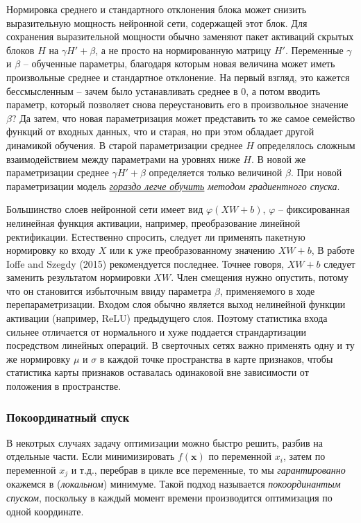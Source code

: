 \documentclass[%
	11pt,
	a4paper,
	utf8,
]{article}
\begin{document}
Нормировка среднего и стандартного отклонения блока может снизить выразительную мощность нейронной сети, содержащей этот блок. Для сохранения выразительной мощности обычно заменяют пакет активаций скрытых блоков $ H $ на $ \gamma H' + \beta $, а не просто на нормированную матрицу $ H' $. Переменные $ \gamma $ и $ \beta $ -- обученные параметры, благодаря которым новая величина может иметь произвольные среднее и стандартное отклонение. На первый взгляд, это кажется бессмысленным -- зачем было устанавливать среднее в 0, а потом вводить параметр, который позволяет снова переустановить его в произвольное значение $ \beta $? Да затем, что новая параметризация может представить то же самое семейство функций от входных данных, что и старая, но при этом обладает другой динамикой обучения. В старой параметризации среднее $ H $ определялось сложным взаимодействием между параметрами на уровнях ниже $ H $. В новой же параметризации среднее $ \gamma H' +\beta $ определяется только величиной $ \beta $. При новой параметризации модель \underline{\itshape гораздо легче обучить} \emph{методом градиентного спуска}.

Большинство слоев нейронной сети имеет вид $ \varphi (X W +b) $, $ \varphi $ -- фиксированная нелинейная функция активации, например, преобразование линейной ректификации. Естественно спросить, следует ли применять пакетную нормировку ко входу $ X $ или к уже преобразованному значению $ X W +b $, В работе Ioffe and Szegdy (2015) рекомендуется последнее. Точнее говоря, $ X W + b $ следует заменить результатом нормировки $ X W $. Член смещения нужно опустить, потому что он становится избыточным ввиду параметра $ \beta $, применяемого в ходе перепараметризации. Входом слоя обычно является выход нелинейной функции активации (например, ReLU) предыдущего слоя. Поэтому статистика входа сильнее отличается от нормального и хуже поддается страндартизации посредством линейных операций. В сверточных сетях важно применять одну и ту же нормировку $ \mu $ и $ \sigma $ в каждой точке пространства в карте признаков, чтобы статистика карты признаков оставалась одинаковой вне зависимости от положения в пространстве.

\subsubsection{Покоординатный спуск}

В некотрых случаях задачу оптимизации можно быстро решить, разбив на отдельные части. {\color{blue}Если минимизировать $ f(\mathbf{x}) $ по переменной $ x_i $, затем по переменной $ x_j $ и т.д., перебрав в цикле все переменные, то мы \emph{гарантированно} окажемся в (\emph{локальном}) минимуме.} Такой подход называется \emph{покоординантым спуском}, поскольку в каждый момент времени производится оптимизация по одной координате.
\end{document}
